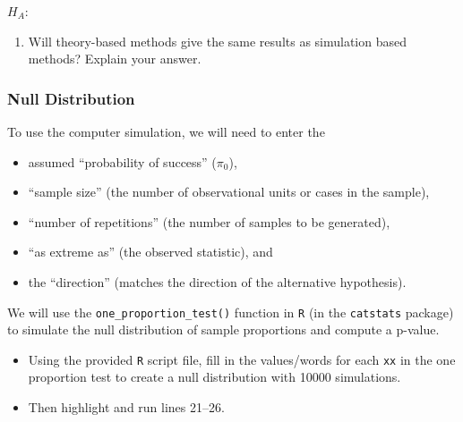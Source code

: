 \documentclass[
]{report}
\providecommand{\tightlist}{%
  \setlength{\itemsep}{0pt}\setlength{\parskip}{0pt}}
\begin{document}
\vspace{0.3in}

\(H_A:\)

\vspace{0.3in}

\begin{enumerate}
\def\labelenumi{\arabic{enumi}.}
\setcounter{enumi}{4}
\tightlist
\item
  Will theory-based methods give the same results as simulation based methods? Explain your answer.
\end{enumerate}

\vspace{1in}

\subsubsection*{Null Distribution}\label{null-distribution}

To use the computer simulation, we will need to enter the

\begin{itemize}
\item
  assumed ``probability of success'' (\(\pi_0\)),
\item
  ``sample size'' (the number of observational units or cases in the sample),
\item
  ``number of repetitions'' (the number of samples to be generated),
\item
  ``as extreme as'' (the observed statistic), and
\item
  the ``direction'' (matches the direction of the alternative hypothesis).
\end{itemize}

We will use the \texttt{one\_proportion\_test()} function in \texttt{R} (in the \texttt{catstats} package) to simulate the null distribution of sample proportions and compute a p-value.

\begin{itemize}
\item
  Using the provided \texttt{R} script file, fill in the values/words for each \texttt{xx} in the one proportion test to create a null distribution with 10000 simulations.
\item
  Then highlight and run lines 21--26.
\end{itemize}
\end{document}
